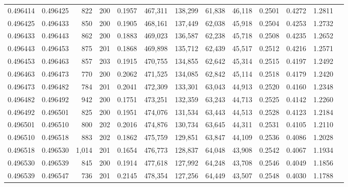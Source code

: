 \begin{tabular}{rrrrrrrrrrrrr}
0.496414 & 0.496425 &   822 & 200 &                                     0.1957 & 467,311 & 138,299 &  61,838 &  46,118 & 0.2501 & 0.4272 & 1.2811 \\
0.496425 & 0.496433 &   850 & 200 &                                     0.1905 & 468,161 & 137,449 &  62,038 &  45,918 & 0.2504 & 0.4253 & 1.2732 \\
0.496433 & 0.496443 &   862 & 200 &                                     0.1883 & 469,023 & 136,587 &  62,238 &  45,718 & 0.2508 & 0.4235 & 1.2652 \\
0.496443 & 0.496453 &   875 & 201 &                                     0.1868 & 469,898 & 135,712 &  62,439 &  45,517 & 0.2512 & 0.4216 & 1.2571 \\
0.496453 & 0.496463 &   857 & 203 &                                     0.1915 & 470,755 & 134,855 &  62,642 &  45,314 & 0.2515 & 0.4197 & 1.2492 \\
0.496463 & 0.496473 &   770 & 200 &                                     0.2062 & 471,525 & 134,085 &  62,842 &  45,114 & 0.2518 & 0.4179 & 1.2420 \\
0.496473 & 0.496482 &   784 & 201 &                                     0.2041 & 472,309 & 133,301 &  63,043 &  44,913 & 0.2520 & 0.4160 & 1.2348 \\
0.496482 & 0.496492 &   942 & 200 &                                     0.1751 & 473,251 & 132,359 &  63,243 &  44,713 & 0.2525 & 0.4142 & 1.2260 \\
0.496492 & 0.496501 &   825 & 200 &                                     0.1951 & 474,076 & 131,534 &  63,443 &  44,513 & 0.2528 & 0.4123 & 1.2184 \\
0.496501 & 0.496510 &   800 & 202 &                                     0.2016 & 474,876 & 130,734 &  63,645 &  44,311 & 0.2531 & 0.4105 & 1.2110 \\
0.496510 & 0.496518 &   883 & 202 &                                     0.1862 & 475,759 & 129,851 &  63,847 &  44,109 & 0.2536 & 0.4086 & 1.2028 \\
0.496518 & 0.496530 & 1,014 & 201 &                                     0.1654 & 476,773 & 128,837 &  64,048 &  43,908 & 0.2542 & 0.4067 & 1.1934 \\
0.496530 & 0.496539 &   845 & 200 &                                     0.1914 & 477,618 & 127,992 &  64,248 &  43,708 & 0.2546 & 0.4049 & 1.1856 \\
0.496539 & 0.496547 &   736 & 201 &                                     0.2145 & 478,354 & 127,256 &  64,449 &  43,507 & 0.2548 & 0.4030 & 1.1788 \\

\end{tabular}
